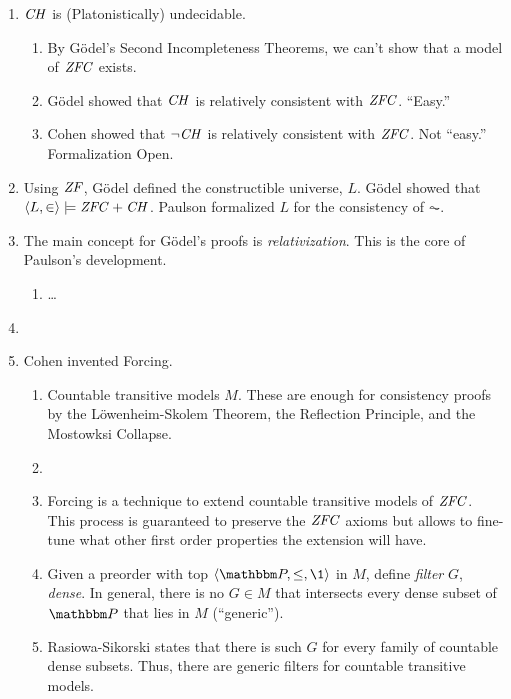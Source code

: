\begin{enumerate}
\item $\mathit{CH}$ is (Platonistically) undecidable.
  \begin{enumerate}
  \item By G\"odel's Second Incompleteness Theorems, we can't show
    that a model of $\mathit{ZFC}$ exists.
  \item G\"odel showed that $\mathit{CH}$ is relatively consistent with
    $\mathit{ZFC}$. ``Easy.''
  \item Cohen showed that  $\neg\mathit{CH}$ is relatively consistent with
    $\mathit{ZFC}$. Not ``easy.'' Formalization Open.
  \end{enumerate}
\item Using $\mathit{ZF}$, G\"odel defined the constructible universe,
  $L$. G\"odel showed that $\langle L,\in\rangle\models \mathit{ZFC}+\mathit{CH}$. Paulson formalized $L$
  for the consistency of $\AC$.
\item The main concept for G\"odel's proofs is
  \emph{relativization}. This is the core of Paulson's development.
  \begin{enumerate}
  \item \dots
  \end{enumerate}
\item 
\item Cohen invented Forcing.
  \begin{enumerate}
  \item Countable transitive models $M$. These are enough for consistency
    proofs by the L\"owenheim-Skolem Theorem, the Reflection
    Principle, and the Mostowksi Collapse.
  \item 
  \item Forcing is a technique to extend countable transitive models of
    $\mathit{ZFC}$. This process is guaranteed to preserve the $\mathit{ZFC}$
    axioms but allows to fine-tune what other first order properties the
    extension will have. 
  \item Given a preorder with top $\lb\PP,\leq,\1\rb$ in $M$, define
    \emph{filter} $G$, \emph{dense}. In general, there is no  $G\in M$
    that intersects every dense
    subset of $\PP$ that lies in $M$ (``generic'').
  \item Rasiowa-Sikorski states that there is such $G$ for every
    family of countable dense subsets. Thus, there are generic filters
    for countable transitive models.
  \end{enumerate}

\end{enumerate}

